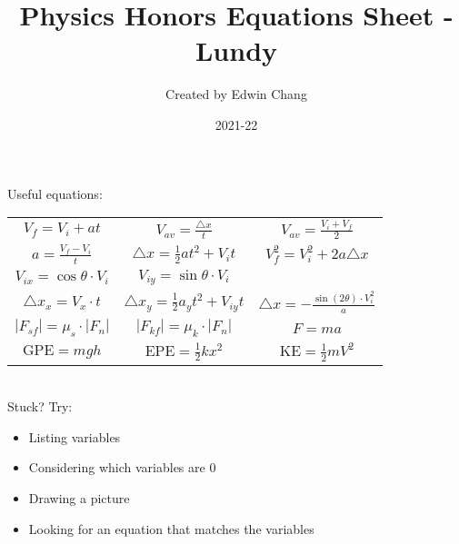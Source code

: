 \documentclass[12pt]{article}
\title{Physics Honors Equations Sheet - Lundy}
\author{Created by Edwin Chang}
\date{2021-22}
\begin{document}

\maketitle

\setlength{\parindent}{0pt} %

Useful equations:
\begin{center}
\begingroup
\setlength{\tabcolsep}{16pt} %
\renewcommand{\arraystretch}{2.25} %
\begin{tabular}{ c c c }
    $V_f = V_i + at$ & $V_{av} = \frac{\triangle x}{t}$ & $V_{av} = \frac{V_i + V_f}{2}$ \\
    $a = \frac{V_f - V_i}{t}$ & $\triangle x = \frac{1}{2}a{t^2} + V_{i}t$ & $V_{f}^{2} = V_{i}^{2} + 2a\triangle x$ \\
    $V_{ix} = \cos{\theta} \cdot V_i$ & $V_{iy} = \sin{\theta} \cdot V_i$ \\
    $\triangle x_x = V_x \cdot t$ & $\triangle x_y = \frac{1}{2} a_{y}{t^2} + V_{iy}t$ & $\triangle x = -\frac{\sin{(2\theta)} \cdot {V_{i}^2}}{a}$ \\
    $|F_{sf}|=\mu_{s}\cdot|F_{n}|$ & $|F_{kf}|=\mu_{k}\cdot|F_{n}|$ & $F=ma$ \\
    $\text{GPE}=mgh$ & $\text{EPE}=\frac{1}{2}k{x^2}$ & $\text{KE}=\frac{1}{2}m{V^2}$
\end{tabular}
\endgroup
\end{center}
\ \\
Stuck? Try:
\begin{itemize}
    \item Listing variables
    \item Considering which variables are 0
    \item Drawing a picture
    \item Looking for an equation that matches the variables
\end{itemize}
\end{document}
